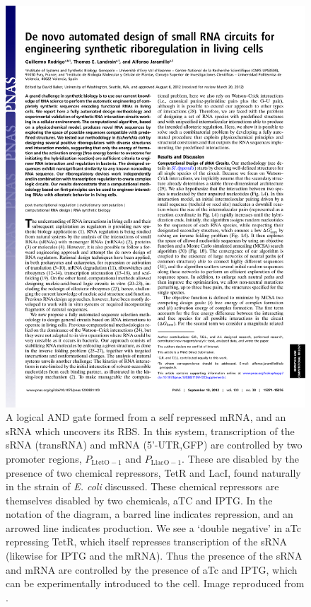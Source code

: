 \documentclass[10pt,journal]{./IEEE_latex_class/IEEEtran}
\begin{document}
\begin{figure}[t]
\centering
\includegraphics[trim = 30 600 30 0,page=4,clip = true]{pnas1203831109.pdf}
\caption{A logical AND gate formed from a self repressed mRNA, and an sRNA which uncovers its RBS. In this system, transcription of the sRNA (transRNA) and mRNA (5'-UTR,GFP) are controlled by two promoter regions, $P_{\mathrm{LtetO-1}}$ and $P_\mathrm{LlacO-1}$. These are disabled by the presence of two chemical repressors, TetR and LacI, found naturally in the strain of \textit{E. coli} discussed. These chemical repressors are themselves disabled by two chemicals, aTC and IPTG. In the notation of the diagram, a barred line indicates repression, and an arrowed line indicates production. We see a `double negative' in aTc repressing TetR, which itself represses transcription of the sRNA (likewise for IPTG and the mRNA). Thus the presence of the sRNA and mRNA are controlled by the presence of aTc and IPTG, which can be experimentally introduced to the cell.  Image reproduced from \cite{Rodrigo2012}.}
\label{ANDGate}
\end{figure}
\end{document}
